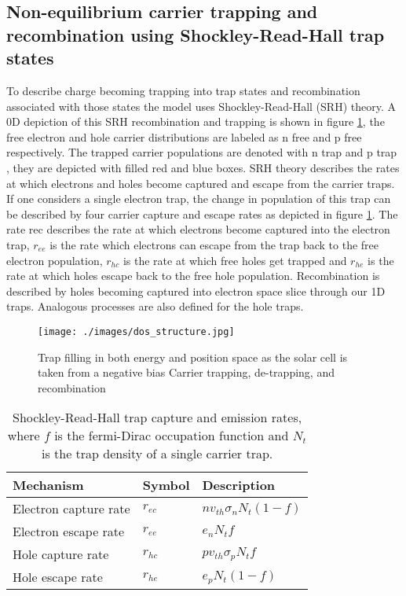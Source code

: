 \subsection{Non-equilibrium carrier trapping and recombination using Shockley-Read-Hall trap states} \label{sssec:dynamic}


To describe charge becoming trapping into trap states and recombination associated with those states the model uses Shockley-Read-Hall (SRH) theory. A 0D depiction of this SRH recombination and trapping is shown in figure \ref{fig:dos_structure}, the free electron and hole carrier distributions are labeled as n free and p free respectively. The trapped carrier populations are denoted with n trap and p trap , they are depicted with filled red and blue boxes. SRH theory describes the rates at which electrons and holes become captured and escape from the carrier traps. If one considers a single electron trap, the change in population of this trap can be described by four carrier capture and escape rates as depicted in figure \ref{fig:dos_structure}. The rate rec describes the rate at which electrons become captured into the electron trap, $r_{ee}$ is the rate which electrons can escape from the trap back to the free electron population, $r_{hc}$ is the rate at which free holes get trapped and $r_{he}$ is the rate at which holes escape back to the free hole population. Recombination is described by holes becoming captured into electron space slice through our 1D traps. Analogous processes are also defined for the hole traps.



\begin{figure}
\texttt{[image: ./images/dos\_structure.jpg]}
\caption{Trap filling in both energy and position space as the solar cell is taken from a negative bias
Carrier trapping, de-trapping, and recombination}
\label{fig:dos_structure}
\end{figure}

\begin{table}
\begin{center}
  \begin{tabular}{lll}
  \hline
  Mechanism & Symbol & Description  \\
  \hline
Electron capture rate & $r_{ec}$ & $n v_{th} \sigma_{n} N_{t}(1-f)$ \\
Electron escape rate & $r_{ee}$ & $e_{n} N_{t} f$ \\
Hole capture rate & $r_{hc}$ & $p v_{th} \sigma_{p} N_{t} f$ \\
Hole escape rate & $r_{he}$ & $e_{p} N_{t} (1-f)$\\
  \hline
\end{tabular}
\end{center}
\caption{Shockley-Read-Hall trap capture and emission rates, where $f$ is the fermi-Dirac occupation function and $N_{t}$ is the trap density of a single carrier trap.}
\label{tab:rates}
\end{table}



